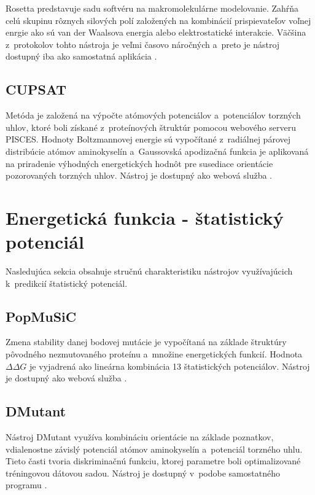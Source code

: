 Rosetta predstavuje sadu softvéru na makromolekulárne modelovanie. Zahŕňa celú skupinu rôznych silových polí založených na kombinácií prispievateľov voľnej enrgie ako sú van der Waalsova energia alebo elektrostatické interakcie. Väčšina z~protokolov tohto nástroja je veľmi časovo náročných a~preto je nástroj dostupný iba ako samostatná aplikácia \cite{rosetta}.

\subsection{CUPSAT}

Metóda je založená na výpočte atómových potenciálov a~potenciálov torzných uhlov, ktoré boli získané z~proteínových štruktúr pomocou webového serveru PISCES. Hodnoty Boltzmannovej energie sú vypočítané z~radiálnej párovej distribúcie atómov aminokyselín a~Gaussovská apodizačná funkcia je aplikovaná na priradenie výhodných energetických hodnôt pre susediace orientácie pozorovaných torzných uhlov. Nástroj je dostupný ako webová služba \cite{cupsat}.  

\section{Energetická funkcia - štatistický potenciál}

Nasledujúca sekcia obsahuje stručnú charakteristiku nástrojov využívajúcich k~predikcií štatistický potenciál.

\subsection{PopMuSiC}

Zmena stability danej bodovej mutácie je vypočítaná na základe štruktúry pôvodného nezmutovaného proteínu a~množine energetických funkcií. Hodnota $\Delta\Delta G$ je vyjadrená ako lineárna kombinácia 13 štatistických potenciálov. Nástroj je dostupný ako webová služba \cite{popmusic}.


\subsection{DMutant}

Nástroj DMutant využíva kombináciu orientácie na základe poznatkov, vdialenostne závislý potenciál atómov aminokyselín a~potenciál torzného uhlu. Tieto časti tvoria diskriminačnú funkciu, ktorej parametre boli optimalizované tréningovou dátovou sadou. Nástroj je dostupný v~podobe samostatného programu \cite{dmutant}.

